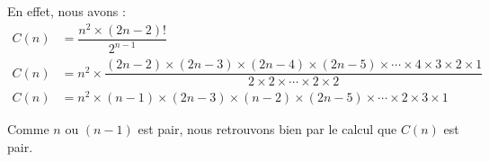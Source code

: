\medskip

En effet, nous avons :
\begin{align*}
	C(n)
	  & = \dfrac{n^2 \times (2n - 2)!}{2^{n-1}}
	\\
	C(n)
	  & = n^2 \times \dfrac{(2n - 2) \times (2n - 3) \times (2n - 4) \times (2n - 5) \times \cdots \times 4 \times 3 \times 2 \times 1}{2 \times 2 \times \cdots \times 2 \times 2}
	\\
	C(n)
	  & = n^2 \times (n - 1) \times (2n - 3) \times (n - 2) \times (2n - 5) \times \cdots \times 2 \times 3 \times 1
\end{align*}


Comme $n$ ou $(n -1)$ est pair, nous retrouvons bien par le calcul que $C(n)$ est pair. 